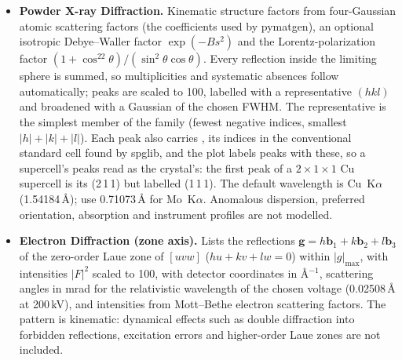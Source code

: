 \begin{itemize}
\item \textbf{Powder X-ray Diffraction.} Kinematic structure factors from four-Gaussian atomic scattering factors (the coefficients used by pymatgen), an optional isotropic Debye--Waller factor $\exp(-Bs^2)$ and the Lorentz-polarization factor $(1+\cos^22\theta)/(\sin^2\theta\cos\theta)$. Every reflection inside the limiting sphere is summed, so multiplicities and systematic absences follow automatically; peaks are scaled to 100, labelled with a representative $(hkl)$ and broadened with a Gaussian of the chosen FWHM. The representative is the simplest member of the family (fewest negative indices, smallest $|h|+|k|+|l|$). Each peak also carries , its indices in the conventional standard cell found by spglib, and the plot labels peaks with these, so a supercell's peaks read as the crystal's: the first peak of a $2\times1\times1$ Cu supercell is its (2\,1\,1) but labelled (1\,1\,1). The default wavelength is Cu~K$\alpha$ (1.54184\,\AA); use 0.71073\,\AA{} for Mo~K$\alpha$. Anomalous dispersion, preferred orientation, absorption and instrument profiles are not modelled.
\item \textbf{Electron Diffraction (zone axis).} Lists the reflections $\mathbf g=h\mathbf b_1+k\mathbf b_2+l\mathbf b_3$ of the zero-order Laue zone of $[uvw]$ ($hu+kv+lw=0$) within $|g|_{\max}$, with intensities $|F|^2$ scaled to 100, with detector coordinates in \AA$^{-1}$, scattering angles in mrad for the relativistic wavelength of the chosen voltage (0.02508\,\AA{} at 200\,kV), and intensities from Mott--Bethe electron scattering factors. The pattern is kinematic: dynamical effects such as double diffraction into forbidden reflections, excitation errors and higher-order Laue zones are not included.
\end{itemize}

